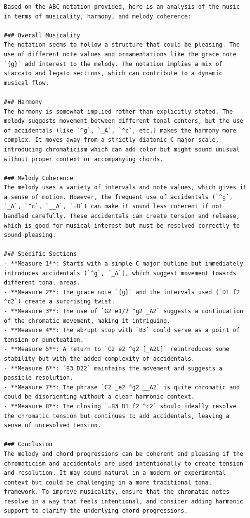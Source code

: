 \documentclass[data-science]{agh-wi} %
\begin{document}
\begin{verbatim}
Based on the ABC notation provided, here is an analysis of the music in terms of musicality, harmony, and melody coherence:

### Overall Musicality
The notation seems to follow a structure that could be pleasing. The use of different note values and ornamentations like the grace note `{g}` add interest to the melody. The notation implies a mix of staccato and legato sections, which can contribute to a dynamic musical flow.

### Harmony
The harmony is somewhat implied rather than explicitly stated. The melody suggests movement between different tonal centers, but the use of accidentals (like `^g`, `_A`, `^c`, etc.) makes the harmony more complex. It moves away from a strictly diatonic C major scale, introducing chromaticism which can add color but might sound unusual without proper context or accompanying chords.

### Melody Coherence
The melody uses a variety of intervals and note values, which gives it a sense of motion. However, the frequent use of accidentals (`^g`, `_A`, `^c`, `__A`, `=B`) can make it sound less coherent if not handled carefully. These accidentals can create tension and release, which is good for musical interest but must be resolved correctly to sound pleasing. 

### Specific Sections
- **Measure 1**: Starts with a simple C major outline but immediately introduces accidentals (`^g`, `_A`), which suggest movement towards different tonal areas.
- **Measure 2**: The grace note `{g}` and the intervals used (`D1 f2 ^c2`) create a surprising twist.
- **Measure 3**: The use of `G2 e1/2 ^g2 _A2` suggests a continuation of the chromatic movement, making it intriguing.
- **Measure 4**: The abrupt stop with `B3` could serve as a point of tension or punctuation.
- **Measure 5**: A return to `C2 e2 ^g2 [_A2C]` reintroduces some stability but with the added complexity of accidentals.
- **Measure 6**: `B3 D22` maintains the movement and suggests a possible resolution.
- **Measure 7**: The phrase `C2 _e2 ^g2 __A2` is quite chromatic and could be disorienting without a clear harmonic context.
- **Measure 8**: The closing `=B3 D1 f2 ^c2` should ideally resolve the chromatic tension but continues to add accidentals, leaving a sense of unresolved tension.

### Conclusion
The melody and chord progressions can be coherent and pleasing if the chromaticism and accidentals are used intentionally to create tension and resolution. It may sound natural in a modern or experimental context but could be challenging in a more traditional tonal framework. To improve musicality, ensure that the chromatic notes resolve in a way that feels intentional, and consider adding harmonic support to clarify the underlying chord progressions.
\end{verbatim}
\end{document}
